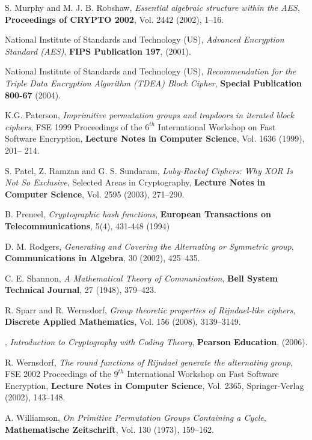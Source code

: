 \documentclass[11pt]{amsart}
\begin{document}
\begin{thebibliography}{9}
 S. Murphy and M. J. B. Robshaw, \emph { Essential algebraic structure within the AES}, {\bf Proceedings of CRYPTO  2002},  Vol. 2442 (2002), 1--16.

  National Institute of Standards and Technology (US),  \emph {Advanced Encryption Standard (AES)}, {\bf FIPS Publication 197}, (2001). 

   National Institute of Standards and Technology (US),  \emph {Recommendation for the Triple Data Encryption Algorithm (TDEA) Block Cipher}, {\bf Special Publication 800-67} (2004). 

 K.G. Paterson, \emph {Imprimitive permutation groups and trapdoors in iterated block ciphers},  FSE 1999 Proceedings of the $6^{th}$ International Workshop on Fast Software Encryption,  {\bf Lecture Notes in Computer Science}, Vol. 1636 (1999), 201-- 214.

  S. Patel, Z. Ramzan and  G. S. Sundaram, \emph {Luby-Rackof Ciphers: Why XOR Is Not So Exclusive}, Selected Areas in Cryptography, {\bf Lecture Notes in Computer Science},  Vol.  2595 (2003),  271--290.

 B. Preneel, \emph{Cryptographic hash functions}, {\bf European Transactions on Telecommunications}, 5(4), 431-448 (1994)

 D. M. Rodgers, \emph {Generating and Covering the Alternating or Symmetric group}, {\bf  Communications in Algebra}, 30 (2002), 425--435. 

 C. E. Shannon, \emph {A Mathematical Theory of Communication}, {\bf Bell System Technical Journal}, 27 (1948),  379--423. 

 R. Sparr and R. Wernsdorf, \emph {Group theoretic properties of Rijndael-like ciphers}, {\bf Discrete Applied Mathematics}, Vol. 156 (2008), 3139--3149.

, \emph{Introduction to {C}ryptography with {C}oding {T}heory}, {\bf Pearson {E}ducation}, (2006).

 R. Wernsdorf, \emph {The round functions of Rijndael generate the alternating group}, FSE 2002 Proceedings of the $9^{th}$ International Workshop on Fast Software Encryption,  {\bf Lecture Notes in Computer Science}, Vol. 2365, Springer-Verlag (2002), 143--148.

 A. Williamson, \emph {On Primitive Permutation Groups Containing a Cycle}, {\bf Mathematische Zeitschrift}, Vol. 130 (1973), 159--162.

\end{thebibliography}
\end{document}
